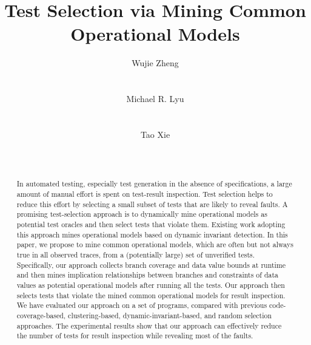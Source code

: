 \documentclass{sig-alternate}
\begin{document}
%

\title{ Test Selection via Mining Common Operational Models }

\author{
\alignauthor
Wujie Zheng\\
       \\
       \\
\alignauthor Michael R. Lyu\\
       \\
       \\
\alignauthor Tao Xie\\
       \\
       \\
}
\maketitle

\begin{abstract}
In automated testing, especially test generation in the absence of
specifications, a large amount of manual effort is spent on
test-result inspection. Test selection helps to reduce this effort
by selecting a small subset of tests that are likely to reveal
faults. A promising test-selection approach is to dynamically mine
operational models as potential test oracles and then select tests
that violate them. Existing work adopting this approach mines
operational models based on dynamic invariant detection. In this
paper, we propose to mine common operational models, which are often
but not always true in all observed traces, from a (potentially
large) set of unverified tests. Specifically, our approach collects
branch coverage and data value bounds at runtime and then mines
implication relationships between branches and constraints of data
values as potential operational models after running all the tests.
Our approach then selects tests that violate the mined common
operational models for result inspection. We have evaluated our
approach on a set of programs, compared with previous
code-coverage-based, clustering-based, dynamic-invariant-based, and
random selection approaches. The experimental results show that our
approach can effectively reduce the number of tests for result
inspection while revealing most of the faults.


\end{abstract}
\end{document}
